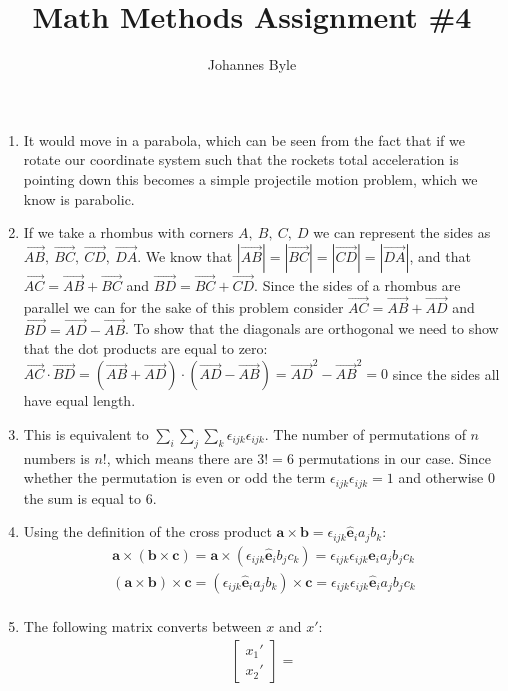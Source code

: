 \documentclass[12pt]{article}
\title{Math Methods Assignment \#4}
\author{Johannes Byle}
\begin{document}
  \maketitle
  \begin{enumerate}
    \item It would move in a parabola, which can be seen from the fact that if we rotate our coordinate system such that the rockets total acceleration is pointing down this becomes a simple projectile motion problem, which we know is parabolic.
    \item If we take a rhombus with corners $A,\ B,\ C,\ D$ we can represent the sides as $\vec{AB},\ \vec{BC},\ \vec{CD},\ \vec{DA}$.
    We know that $|\vec{AB}|=|\vec{BC}|=|\vec{CD}|=|\vec{DA}|$, and that $\vec{AC}=\vec{AB}+\vec{BC}$ and $\vec{BD}=\vec{BC}+\vec{CD}$.
    Since the sides of a rhombus are parallel we can for the sake of this problem consider $\vec{AC}=\vec{AB}+\vec{AD}$ and $\vec{BD}=\vec{AD}-\vec{AB}$.
    To show that the diagonals are orthogonal we need to show that the dot products are equal to zero: $\vec{AC}\cdot\vec{BD}=\left(\vec{AB}+\vec{AD}\right)\cdot\left(\vec{AD}-\vec{AB}\right)=\vec{AD}^2-\vec{AB}^2=0$ since the sides all have equal length.
    \item This is equivalent to $\sum_i\sum_j\sum_k \epsilon_{ijk}\epsilon_{ijk}$.
    The number of permutations of $n$ numbers is $n!$, which means there are $3!=6$ permutations in our case.
    Since whether the permutation is even or odd the term $\epsilon_{ijk}\epsilon_{ijk}=1$ and otherwise 0 the sum is equal to 6.
    \item Using the definition of the cross product $\pmb{a}\times\pmb{b}=\epsilon_{ijk}\pmb{\hat{e}}_i a_j b_k$:
    \begin{gather*}
      \pmb{a}\times(\pmb{b}\times\pmb{c})=\pmb{a}\times(\epsilon_{ijk}\pmb{\hat{e}}_i b_j c_k)=\epsilon_{ijk}\epsilon_{ijk}\pmb{\hat{e}}_i a_j b_j c_k\\
      (\pmb{a}\times\pmb{b})\times\pmb{c}=(\epsilon_{ijk}\pmb{\hat{e}}_i a_j b_k)\times\pmb{c}=\epsilon_{ijk}\epsilon_{ijk}\pmb{\hat{e}}_i a_j b_j c_k\\
    \end{gather*}
    \item The following matrix converts between $x$ and $x'$:
    \begin{gather}
      \begin{bmatrix}
        x_1' \\
        x_2'
      \end{bmatrix}=

\end{gather}
\end{enumerate}
\end{document}
